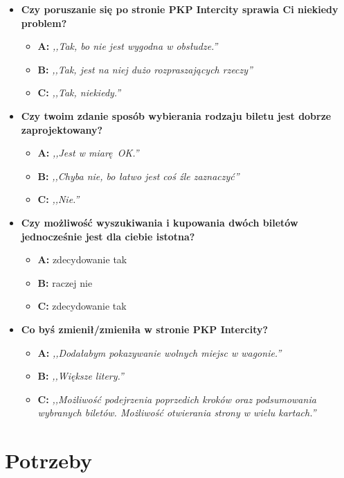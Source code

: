 \documentclass[12pt, a4paper, oneside]{report}
\begin{document}
\begin{itemize}
    \item\textbf{Czy poruszanie się po stronie PKP Intercity sprawia Ci 
    niekiedy problem?}
    \begin{itemize}
        \item \textbf{A:} \textit{,,Tak, bo nie jest wygodna w obsłudze.''}
        \item \textbf{B:} \textit{,,Tak, jest na niej dużo rozpraszających 
        rzeczy''}
        \item \textbf{C:} \textit{,,Tak, niekiedy.''}
    \end{itemize}

    \item\textbf{Czy twoim zdanie sposób wybierania rodzaju biletu jest dobrze 
    zaprojektowany?}
    \begin{itemize}
        \item \textbf{A:} \textit{,,Jest w miarę OK.''}
        \item \textbf{B:} \textit{,,Chyba nie, bo łatwo jest coś źle 
        zaznaczyć''}
        \item \textbf{C:} \textit{,,Nie.''}
    \end{itemize}

    \item\textbf{Czy możliwość wyszukiwania i kupowania dwóch biletów 
    jednocześnie jest dla ciebie istotna?}
    \begin{itemize}
        \item \textbf{A:} zdecydowanie tak
        \item \textbf{B:} raczej nie
        \item \textbf{C:} zdecydowanie tak
    \end{itemize}

    \item\textbf{Co byś zmienił/zmieniła w stronie PKP Intercity?}
    \begin{itemize}
        \item \textbf{A:} \textit{,,Dodałabym pokazywanie wolnych miejsc w 
        wagonie.''}
        \item \textbf{B:} \textit{,,Większe litery.''}
        \item \textbf{C:} \textit{,,Możliwość podejrzenia poprzedich kroków 
        oraz podsumowania wybranych biletów. Możliwość otwierania strony w 
        wielu kartach.''}
    \end{itemize}
\end{itemize}

\section*{Potrzeby}
\end{document}
